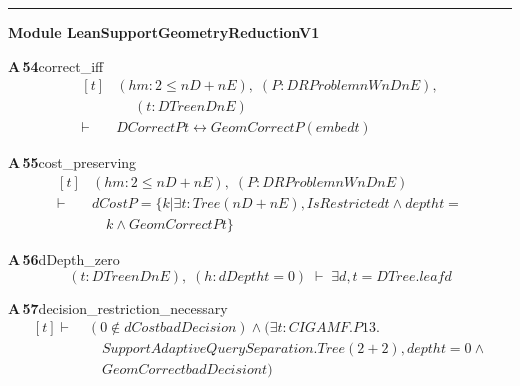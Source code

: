 \documentclass[conference]{IEEEtran}
\theoremstyle{definition}
\newcommand{\lean}[1]{\textsf{\footnotesize #1}}
\begin{document}
\vspace{4pt}\noindent\rule{\columnwidth}{0.4pt}\par\vspace{2pt}
\noindent\textbf{Module \lean{LeanSupportGeometryReductionV1}}\par\vspace{3pt}

\noindent\textbf{A\,54}\quad\lean{correct\_iff}
{\footnotesize\[ \begin{aligned}[t]
&(\mathit{hm} : 2 \leq \mathit{nD} + \mathit{nE}),\; (\mathit{P} : \mathit{DRProblem} \mathit{nW} \mathit{nD} \mathit{nE}),\\
&\quad \; (\mathit{t} : \mathit{DTree} \mathit{nD} \mathit{nE})\\
\vdash\;&\mathit{DCorrect} \mathit{P} \mathit{t} \leftrightarrow \mathit{GeomCorrect} \mathit{P} (\mathit{embed} \mathit{t})
\end{aligned} \]}

\noindent\textbf{A\,55}\quad\lean{cost\_preserving}
{\footnotesize\[ \begin{aligned}[t]
&(\mathit{hm} : 2 \leq \mathit{nD} + \mathit{nE}),\; (\mathit{P} : \mathit{DRProblem} \mathit{nW} \mathit{nD} \mathit{nE})\\
\vdash\;&\mathit{dCost} \mathit{P} = \{ \mathit{k} | \exists \mathit{t} : \mathit{Tree} (\mathit{nD} + \mathit{nE}), \mathit{IsRestricted} \mathit{t} \wedge \mathit{depth} \mathit{t} =\\
&\quad \mathit{k} \wedge \mathit{GeomCorrect} \mathit{P} \mathit{t}\}
\end{aligned} \]}

\noindent\textbf{A\,56}\quad\lean{dDepth\_zero}
{\footnotesize\[ (\mathit{t} : \mathit{DTree} \mathit{nD} \mathit{nE}),\; (\mathit{h} : \mathit{dDepth} \mathit{t} = 0) \;\vdash\; \exists \mathit{d}, \mathit{t} = \mathit{DTree}.\mathit{leaf} \mathit{d} \]}

\noindent\textbf{A\,57}\quad\lean{decision\_restriction\_necessary}
{\footnotesize\[ \begin{aligned}[t]
\vdash\;&(0 \notin \mathit{dCost} \mathit{badDecision}) \wedge (\exists \mathit{t} : \mathit{CIGAMF}.\mathit{P13}.\\
&\quad \mathit{SupportAdaptiveQuerySeparation}.\mathit{Tree} (2 + 2), \mathit{depth} \mathit{t} = 0 \wedge\\
&\quad \mathit{GeomCorrect} \mathit{badDecision} \mathit{t})
\end{aligned} \]}
\end{document}
